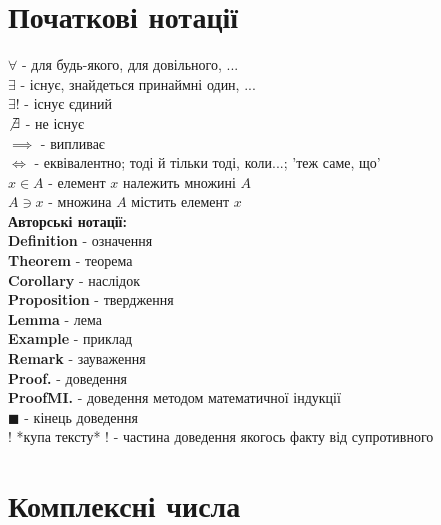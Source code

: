 \documentclass[a4paper, 14pt]{extarticle}
\def\bigline{\vspace{5mm}\\}
\theoremstyle{theoremdd}
\theoremstyle{theoremdd}
\theoremstyle{theoremdd}
\theoremstyle{theoremdd}
\theoremstyle{theoremdd}
\theoremstyle{theoremdd}
\theoremstyle{theoremdd}
\theoremstyle{theoremdd}
\begin{document}

\tableofcontents
\newpage

\section*{Початкові нотації}
$\forall$ - для будь-якого, для довільного, ...\\
$\exists$ - існує, знайдеться принаймні один, ...\\
$\exists!$ - існує єдиний\\
$\not \exists$ - не існує
\bigline
$\implies$ - випливає\\
$\iff$ - еквівалентно; тоді й тільки тоді, коли...; 'теж саме, що'
\bigline
$x \in A$ - елемент $x$ належить множині $A$\\
$A \ni x$ - множина $A$ містить елемент $x$
\bigline

\textbf{Авторські нотації:}\\
\textbf{Definition} - означення\\
\textbf{Theorem} - теорема\\
\textbf{Corollary} - наслідок\\
\textbf{Proposition} - твердження\\
\textbf{Lemma} - лема\\
\textbf{Example} - приклад\\
\textbf{Remark} - зауваження\\
\textbf{Proof.} - доведення\\
\textbf{ProofMI.} - доведення методом математичної індукції\\
$\blacksquare$ - кінець доведення\\
! *купа тексту* ! - частина доведення якогось факту від супротивного
\newpage

\section{Комплексні числа}
\end{document}
